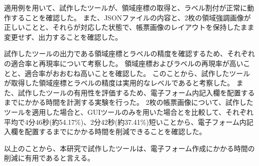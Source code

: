 \documentclass[uplatex, report, a4j, 10pt]{jsbook}
\begin{document}


適用例を用いて、試作したツールが、領域座標の取得と、ラベル割付が正常に動作することを確認した。
また、JSONファイルの内容と、2枚の領域強調画像が正しいことと、それらが対応した状態で、帳票画像のレイアウトを保持したまま変更せず、出力することを確認した。

試作したツールの出力である領域座標とラベルの精度を確認するため、それぞれの適合率と再現率について考察した。
領域座標およびラベルの再現率が高いことと、適合率がおおむね高いことを確認した。
このことから、試作したツールが取得した領域座標とラベルの精度は実用的なレベルであると考察した。
また、試作したツールの有用性を評価するため、電子フォーム内記入欄を配置するまでにかかる時間を計測する実験を行った。
2枚の帳票画像について、試作したツールを適用した場合と、GUIツールのみを用いた場合とを比較して、それぞれ平均で4分46秒(約54.17\%)、2分42秒(約37.41\%)短いことから、電子フォーム内記入欄を配置するまでにかかる時間を削減できることを確認した。

以上のことから、本研究で試作したツールは、電子フォーム作成にかかる時間の削減に有用であると言える。

%
%









\end{document}
